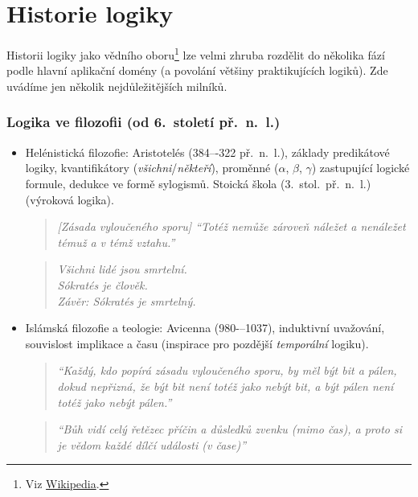 \chapter{Historie logiky}\label{appendix:history}

Historii logiky jako vědního oboru\footnote{Viz \href{https://en.wikipedia.org/wiki/History_of_logic}{Wikipedia}.} lze velmi zhruba rozdělit do několika fází podle hlavní aplikační domény (a povolání většiny praktikujících logiků). Zde uvádíme jen několik nejdůležitějších milníků.


\subsection*{Logika ve filozofii (od 6.\ století př.\ n.\ l.)}

\begin{itemize}
    \item Helénistická filozofie: Aristotelés (384–-322 př.\ n.\ l.), základy predikátové logiky, kvantifikátory (\emph{všichni}/\emph{někteří}), proměnné (\( \alpha \), \( \beta \), \( \gamma \)) zastupující logické formule, dedukce ve formě sylogismů. Stoická škola (3.\ stol.\ př.\ n.\ l.) (výroková logika).

        \begin{quote}\it
            [Zásada vyloučeného sporu] ``Totéž nemůže zároveň náležet a nenáležet témuž a v témž vztahu.'' 
        \end{quote}        

        \begin{quote}\it
            Všichni lidé jsou smrtelní.\\
            Sókratés je člověk.\\
            Závěr: Sókratés je smrtelný.
        \end{quote}

    \item Islámská filozofie a teologie: Avicenna (980-–1037), induktivní uvažování, souvislost implikace a času (inspirace pro pozdější \emph{temporální} logiku).
        
        \begin{quote}\it      
            ``Každý, kdo popírá zásadu vyloučeného sporu, by měl být bit a pálen, dokud nepřizná, že být bit není totéž jako nebýt bit, a být pálen není totéž jako nebýt pálen.''
        \end{quote}
        
        \begin{quote}\it
            ``Bůh vidí celý řetězec příčin a důsledků zvenku (mimo čas), a proto si je vědom každé dílčí události (v čase)''\\  
        \end{quote}


\end{itemize}
